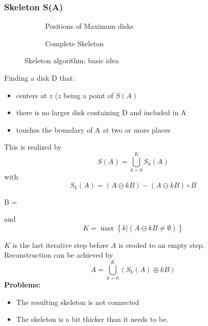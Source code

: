 \subsubsection{Skeleton S(A)}
\begin{figure}[h!]
\centering
\begin{subfigure}[b]{0.45\textwidth}
\centering
{}
\caption{Positions of Maximum disks}
\end{subfigure}
\begin{subfigure}[b]{0.45\textwidth}
\centering
{}
\caption{Complete Skeleton}
\end{subfigure}
\caption{Skeleton algorithm: basic idea}
\end{figure}
\begin{multicols}{2}
Finding a disk D that:
\begin{itemize}
\item centers at $z$ ($z$ being a point of $S(A)$
\item there is no larger disk containing D and included in A
\item touches the boundary of A at two or more places
\end{itemize}

This is realized by
	\[
		S(A) = \bigcup_{k=0}^{K} S_k(A)
	\]
with
	\[
		S_k(A) = (A \ominus kB) - (A \ominus kB) \circ B
	\]
\begin{center}
	B \quad = \quad {}
\end{center}

and
	\[
		K = \max\left\{ k | (A \ominus kB \neq \emptyset) \right\}
	\]

$K$ is the last iterative step before $A$ is eroded to an empty step. \\

Reconstruction can be achieved by
	\[
		A = \bigcup_{k=0}^{K}\left( S_k(A) \oplus kB \right)
	\]
\textbf{Problems:}
\begin{itemize}
	\item The resulting skeleton is not connected
	\item The skeleton is a bit thicker than it needs to be.
\end{itemize}
\end{multicols}

